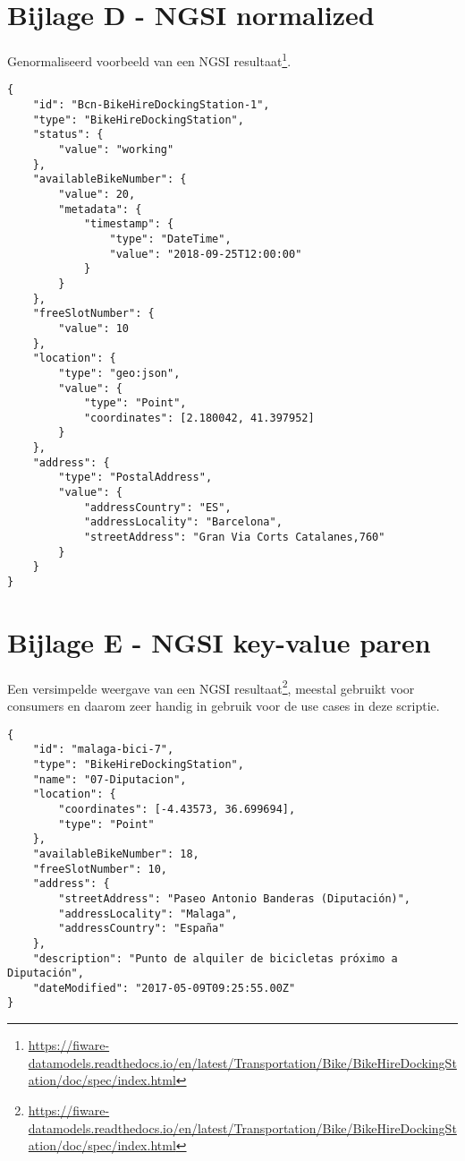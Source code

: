 \begin{appendices}
\section*{Bijlage D - NGSI normalized}
Genormaliseerd voorbeeld van een NGSI resultaat\footnote{\url{https://fiware-datamodels.readthedocs.io/en/latest/Transportation/Bike/BikeHireDockingStation/doc/spec/index.html}}.
\begin{code}
\begin{verbatim}
{
    "id": "Bcn-BikeHireDockingStation-1",
    "type": "BikeHireDockingStation",
    "status": {
        "value": "working"
    },
    "availableBikeNumber": {
        "value": 20,
        "metadata": {
            "timestamp": {
                "type": "DateTime",
                "value": "2018-09-25T12:00:00"
            }
        }
    },
    "freeSlotNumber": {
        "value": 10
    },
    "location": {
        "type": "geo:json",
        "value": {
            "type": "Point",
            "coordinates": [2.180042, 41.397952]
        }
    },
    "address": {
        "type": "PostalAddress",
        "value": {
            "addressCountry": "ES",
            "addressLocality": "Barcelona",
            "streetAddress": "Gran Via Corts Catalanes,760"
        }
    }
}

\end{verbatim}
\end{code}

\section*{Bijlage E - NGSI key-value paren}
Een versimpelde weergave van een NGSI resultaat\footnote{\url{https://fiware-datamodels.readthedocs.io/en/latest/Transportation/Bike/BikeHireDockingStation/doc/spec/index.html}}, meestal gebruikt voor consumers en daarom zeer handig in gebruik voor de use cases in deze scriptie.
\begin{code}
\begin{verbatim}
{
    "id": "malaga-bici-7",
    "type": "BikeHireDockingStation",
    "name": "07-Diputacion",
    "location": {
        "coordinates": [-4.43573, 36.699694],
        "type": "Point"
    },
    "availableBikeNumber": 18,
    "freeSlotNumber": 10,
    "address": {
        "streetAddress": "Paseo Antonio Banderas (Diputación)",
        "addressLocality": "Malaga",
        "addressCountry": "España"
    },
    "description": "Punto de alquiler de bicicletas próximo a Diputación",
    "dateModified": "2017-05-09T09:25:55.00Z"
}
\end{verbatim}
\end{code}

\end{appendices}